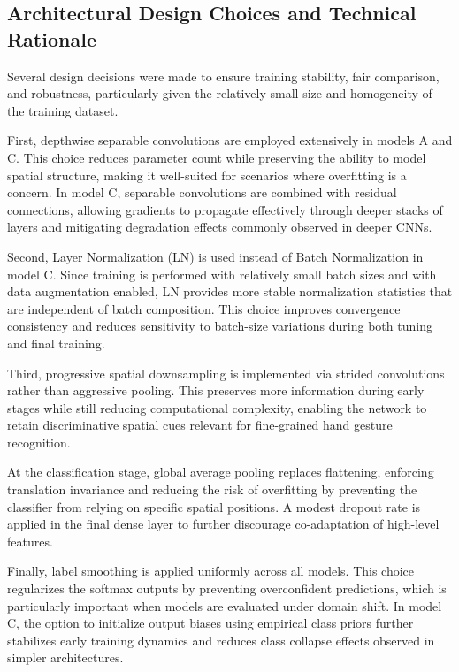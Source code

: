 \documentclass{article}
\begin{document}
\subsection{Architectural Design Choices and Technical Rationale}

Several design decisions were made to ensure training stability, fair comparison, and robustness, particularly given the relatively small size and homogeneity of the training dataset.

First, depthwise separable convolutions are employed extensively in models A and C. This choice reduces parameter count while preserving the ability to model spatial structure, making it well-suited for scenarios where overfitting is a concern. In model C, separable convolutions are combined with residual connections, allowing gradients to propagate effectively through deeper stacks of layers and mitigating degradation effects commonly observed in deeper CNNs.

Second, Layer Normalization (LN) is used instead of Batch Normalization in model C. Since training is performed with relatively small batch sizes and with data augmentation enabled, LN provides more stable normalization statistics that are independent of batch composition. This choice improves convergence consistency and reduces sensitivity to batch-size variations during both tuning and final training.

Third, progressive spatial downsampling is implemented via strided convolutions rather than aggressive pooling. This preserves more information during early stages while still reducing computational complexity, enabling the network to retain discriminative spatial cues relevant for fine-grained hand gesture recognition.

At the classification stage, global average pooling replaces flattening, enforcing translation invariance and reducing the risk of overfitting by preventing the classifier from relying on specific spatial positions. A modest dropout rate is applied in the final dense layer to further discourage co-adaptation of high-level features.

Finally, label smoothing is applied uniformly across all models. This choice regularizes the softmax outputs by preventing overconfident predictions, which is particularly important when models are evaluated under domain shift. In model C, the option to initialize output biases using empirical class priors further stabilizes early training dynamics and reduces class collapse effects observed in simpler architectures.
\end{document}
